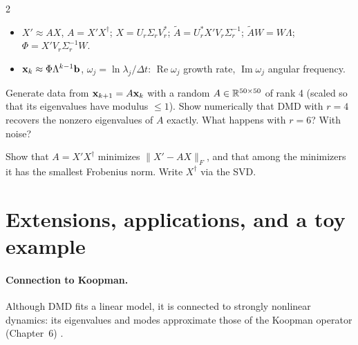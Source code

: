 \begin{paracol}{2}
\begin{keyformulas}
\begin{itemize}
  \item $X'\approx AX$, $A=X'X^\dagger$; $X=U_r\Sigma_rV_r^*$; $\tilde A=U_r^*X'V_r\Sigma_r^{-1}$;
        $\tilde AW=W\Lambda$; $\Phi=X'V_r\Sigma_r^{-1}W$.
  \item $\mathbf{x}_k\approx\Phi\Lambda^{k-1}\mathbf{b}$, $\omega_j=\ln\lambda_j/\Delta t$: $\operatorname{Re}\omega_j$
        growth rate, $\operatorname{Im}\omega_j$ angular frequency.
\end{itemize}
\end{keyformulas}

\begin{exercise}
Generate data from $\mathbf{x}_{k+1}=A\mathbf{x}_k$ with a random $A\in\mathbb{R}^{50\times50}$ of rank 4 (scaled so that its
eigenvalues have modulus $\le1$). Show numerically that DMD with $r=4$ recovers the nonzero eigenvalues of
$A$ exactly. What happens with $r=6$? With noise?
\end{exercise}

\begin{exercise}
Show that $A=X'X^\dagger$ minimizes $\lVert X'-AX\rVert_F$, and that among the minimizers it has the smallest
Frobenius norm. Write $X^\dagger$ via the SVD.
\end{exercise}

\section{Extensions, applications, and a toy example}\label{sec:dmd-examples}

\paragraph{Connection to Koopman.} Although DMD fits a linear model, it is connected to strongly
nonlinear dynamics: its eigenvalues and modes approximate those of the Koopman operator (Chapter~6)
.


\end{paracol}
